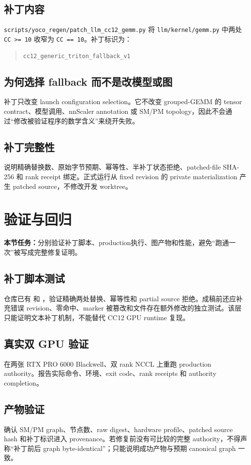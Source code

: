 \documentclass[11pt,a4paper]{ctexart}
\newcommand{\contract}[1]{\par\smallskip\noindent\colorbox{light}{\parbox{0.95\linewidth}{\textbf{本节任务：}#1}}\par\smallskip}
\begin{document}
\subsection{补丁内容}
\texttt{scripts/yoco\_regen/patch\_llm\_cc12\_gemm.py} 将 \texttt{llm/kernel/gemm.py} 中两处 \texttt{CC >= 10} 收窄为 \texttt{CC == 10}。补丁标识为：
\begin{quote}
\texttt{cc12\_generic\_triton\_fallback\_v1}
\end{quote}

\subsection{为何选择 fallback 而不是改模型或图}
补丁只改变 launch configuration selection。它不改变 grouped-GEMM 的 tensor contract、模型调用、nnScaler annotation 或 SM/PM topology，因此不会通过“修改被验证程序的数学含义”来绕开失败。

\subsection{补丁完整性}
说明精确替换数、原始字节预期、幂等性、半补丁状态拒绝、patched-file SHA-256 和 rank receipt 绑定。正式运行从 fixed revision 的 private materialization 产生 patched source，不修改开发 worktree。

\section{验证与回归}
\contract{分别验证补丁脚本、production执行、图产物和性能，避免“跑通一次”被写成完整修复证明。}

\subsection{补丁脚本测试}
仓库已有  和 ，验证精确两处替换、幂等性和 partial source 拒绝。成稿前还应补充错误 revision、零命中、marker 被篡改和文件存在额外修改的独立测试。该层只能证明文本补丁机制，不能替代 CC12 GPU runtime 复现。

\subsection{真实双 GPU 验证}
在两张 RTX PRO 6000 Blackwell、双 rank NCCL 上重跑 production authority。报告实际命令、环境、exit code、rank receipts 和 authority completion。

\subsection{产物验证}
确认 SM/PM graph、节点数、raw digest、hardware profile、patched source hash 和补丁标识进入 provenance。若修复前没有可比较的完整 authority，不得声称“补丁前后 graph byte-identical”；只能说明成功产物与预期 canonical graph 一致。
\end{document}
